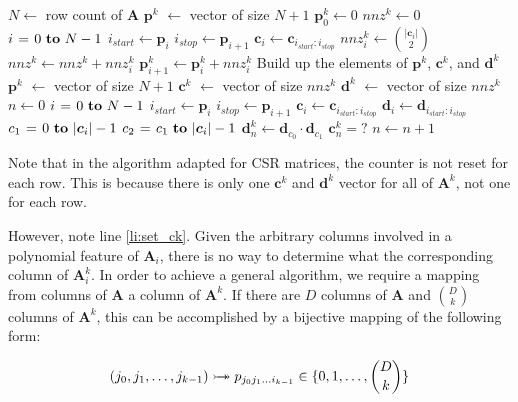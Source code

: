\documentclass{article} %
\begin{document}
\begin{codebox}
\footnotesize
{}
    \li $N \gets$ row count of $\bm{A}$
    \li $\bm{p}^k$ $\gets$ vector of size $N+1$
    \li $\bm{p}^k_0 \gets 0$
    \li $nnz^k \gets 0$
    \li \For $i \gets 0 \To N-1$ \Do
    \li     $i_{start} \gets \bm{p}_i$
    \li     $i_{stop} \gets \bm{p}_{i+1}$
    \li     $\bm{c}_i \gets \bm{c}_{i_{start}:i_{stop}}$
    \li     $nnz^k_i \gets \binom{|\bm{c}_i|}{2}$
    \li     $nnz^k \gets nnz^k + nnz^k_i$
    \li     $\bm{p}^k_{i+1} \gets \bm{p}^k_i + nnz^k_i$
        \End
    \zi     
    \zi \Comment Build up the elements of $\bm{p}^k$, $\bm{c}^k$, and $\bm{d}^k$
    \li $\bm{p}^k$ $\gets$ vector of size $N+1$
    \li $\bm{c}^k$ $\gets$ vector of size $nnz^k$
    \li $\bm{d}^k$ $\gets$ vector of size $nnz^k$
    \li $n \gets 0$
    \li \For $i \gets 0 \To N-1$ \Do
    \li     $i_{start} \gets \bm{p}_i$
    \li     $i_{stop} \gets \bm{p}_{i+1}$
    \li     $\bm{c}_i \gets \bm{c}_{i_{start}:i_{stop}}$
    \li     $\bm{d}_i \gets \bm{d}_{i_{start}:i_{stop}}$
    \li     \For $c_1 \gets 0 \To |\bm{c}_i|-1$ \Do
    \li         \For $c_2 \gets c_1 \To |\bm{c}_i|-1$ \Do
    \li             $\bm{d}^k_{n} \gets \bm{d}_{c_0} \cdot \bm{d}_{c_1}$
    \li             $\bm{c}^k_{n} = ?$ \label{li:set_ck}
    \li             $n \gets n + 1$
                \End
            \End
       	\End
\end{codebox}

Note that in the algorithm adapted for CSR matrices, the counter is not reset for each row.
This is because there is only one $\bm{c}^k$ and $\bm{d}^k$ vector for all of $\bm{A}^k$, not one for each row.

However, note line \ref{li:set_ck}.
Given the arbitrary columns involved in a polynomial feature of $\bm{A}_i$, there is no way to determine what the corresponding column of $\bm{A}^k_i$.
In order to achieve a general algorithm, we require a mapping from columns of $\bm{A}$ a column of $\bm{A}^k$.
If there are $D$ columns of $\bm{A}$ and $\binom{D}{k}$ columns of $\bm{A}^k$, this can be accomplished by a bijective mapping of the following form:

\begin{equation}
(j_0, j_1, \dots, j_{k-1}) \rightarrowtail \hspace{-1.9ex} \twoheadrightarrow p_{j_0j_1 \dots i_{k-1}} \in \{0,1,\dots,\binom{D}{k}\} 
\end{equation}
\end{document}
